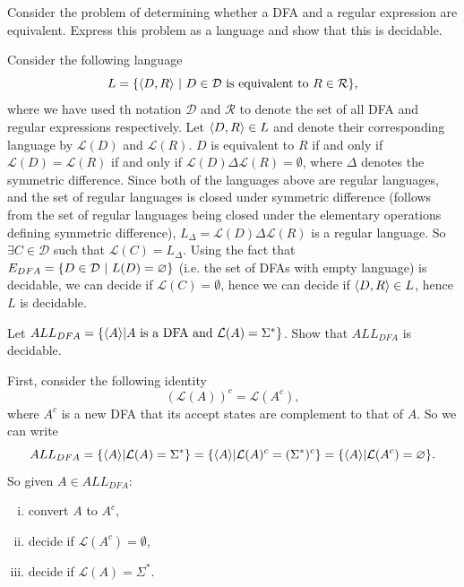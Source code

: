 \begin{problem}[Sipser]
	Consider the problem of determining whether a DFA and a regular expression are equivalent. Express this problem as a language and show that this is decidable.
\end{problem}
\begin{solution}
	Consider the following language
	\[ L = \{\langle D,R\rangle\ |\ \text{$ D\in\mathcal{D} $ is equivalent to $ R \in\mathcal{R} $}\}, \]
	where we have used th notation $ \mathcal{D} $ and $ \mathcal{R} $ to denote the set of all DFA and regular expressions respectively. Let $ \langle D,R\rangle \in L $ and denote their corresponding language by $ \mathcal{L}(D) $ and $ \mathcal{L}(R) $. $ D $ is equivalent to $ R $ if and only if $ \mathcal{L}(D) = \mathcal{L}(R) $ if and only if $ \mathcal{L}(D) \Delta \mathcal{L}(R) = \emptyset $, where $ \Delta $ denotes the symmetric difference. Since both of the languages above are regular languages, and the set of regular languages is closed under symmetric difference (follows from the set of regular languages being closed under the elementary operations defining symmetric difference), $ L_\Delta = \mathcal{L}(D) \Delta \mathcal{L}(R) $ is a regular language. So $ \exists C \in \mathcal{D} $ such that $ \mathcal{L}(C) = L_\Delta $. Using the fact that $ E_{DFA} = \{D\in\mathcal{D}\ |\ L(D)=\varnothing\} $ (i.e. the set of DFAs with empty language) is decidable, we can decide if $ \mathcal{L}(C) = \emptyset $, hence we can decide if $ \langle D,R\rangle\in L $, hence $ L $ is decidable.
\end{solution}


\begin{problem}[Sipser]
	Let $ ALL_{DFA} = \{\langle A\rangle|\text{$ A $ is a DFA and $ \mathcal{L}(A) = \Sigma^* $}\} $. Show that $ ALL_{DFA} $ is decidable.
\end{problem}
\begin{solution}
	First, consider the following identity
	\[ (\mathcal{L}(A))^c = \mathcal{L}(A^c), \]
	where $ A^c $ is a new DFA that its accept states are complement to that of $ A $. So we can write
	\[  ALL_{DFA} =  \{\langle A\rangle|\mathcal{L}(A) = \Sigma^*\} = \{\langle A\rangle|\mathcal{L}(A)^c = (\Sigma^*)^c\} = \{\langle A\rangle|\mathcal{L}(A^c) = \varnothing\}. \]
	So given $ A \in ALL_{DFA} $:
	\begin{enumerate}[(i)]
		\item convert $ A $ to $ A^c $,
		\item decide if $ \mathcal{L}(A^c) = \emptyset $,
		\item decide if $ \mathcal{L}(A) = \Sigma^* $.
	\end{enumerate}
\end{solution}

